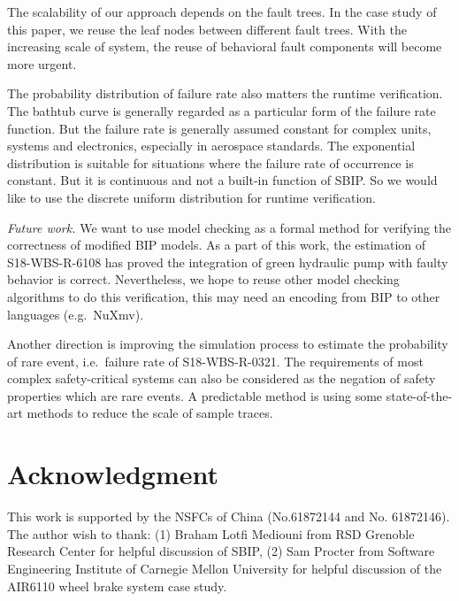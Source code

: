 \documentclass[runningheads]{llncs}
\begin{document}
The scalability of our approach depends on the fault trees. In the case study of this paper, we reuse the leaf nodes between different fault trees. With the increasing scale of system, the reuse of behavioral fault components will become more urgent.

The probability distribution of failure rate also matters the runtime verification. The bathtub curve is generally regarded as a particular form of the failure rate function. But the failure rate is generally assumed constant for complex units, systems and electronics, especially in aerospace standards. The exponential distribution is suitable for situations where the failure rate of occurrence is constant. But it is continuous and not a built-in function of SBIP. So we would like to use the discrete uniform distribution for runtime verification.

\emph{Future work.}  We want to use model checking as a formal method for verifying the correctness of modified BIP models. As a part of this work, the estimation of S18-WBS-R-6108 has proved the integration of green hydraulic pump with faulty behavior is correct. Nevertheless, we hope to reuse other model checking algorithms to do this verification, this may need an encoding from BIP to other languages (e.g.\ NuXmv).

Another direction is improving the simulation process to estimate the probability of rare event, i.e.\ failure rate of S18-WBS-R-0321. The requirements of most complex safety-critical systems can also be considered as the negation of safety properties which are rare events. A predictable method is using some state-of-the-art methods\cite{rarevent1}\cite{rarevent2} to reduce the scale of sample traces.

\section*{Acknowledgment}

This work is supported by the NSFCs of China (No.61872144 and No. 61872146). The author wish to thank: (1) Braham Lotfi Mediouni from RSD Grenoble Research Center for helpful discussion of SBIP, (2) Sam Procter from Software Engineering Institute of Carnegie Mellon University for helpful discussion of the AIR6110 wheel brake system case study.

%
%
%
% 
% 
%



\end{document}
